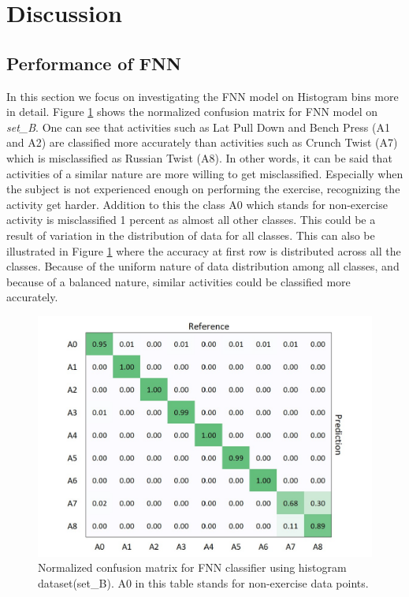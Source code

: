 \documentclass[journal,article,submit,moreauthors,pdftex]{Definitions/mdpi}
\begin{document}
\section{Discussion}
\subsection{Performance of FNN}
In this section we focus on investigating the FNN model on Histogram bins more in detail. 
Figure \ref{fig:fnn_hbins_confusion_matrix} shows the normalized confusion matrix for FNN model on \textit{set\_B}. One can see that activities such as Lat Pull Down and Bench Press (A1 and A2) are classified more accurately than activities such as Crunch Twist (A7) which is misclassified as Russian Twist (A8). In other words, it can be said that activities of a similar nature are more willing to get misclassified. Especially when the subject is not experienced enough on performing the exercise, recognizing the activity get harder. Addition to this the class A0 which stands for non-exercise activity is misclassified 1 percent as almost all other classes. This could be a result of variation in the distribution of data for all classes. This can also be illustrated in Figure \ref{fig:fnn_hbins_confusion_matrix} where the accuracy at first row is distributed across all the classes. Because of the uniform nature of data distribution among all classes, and because of a balanced nature, similar activities could be classified more accurately.\\
\begin{figure}[H]
	\centering
	\includegraphics[width=7 cm]{Definitions/images/fnn_histogram_set.jpg}
	\caption{Normalized confusion matrix for FNN classifier using histogram dataset(set\_B). A0 in this table stands for non-exercise data points.}
	\label{fig:fnn_hbins_confusion_matrix}
\end{figure} 
\end{document}
